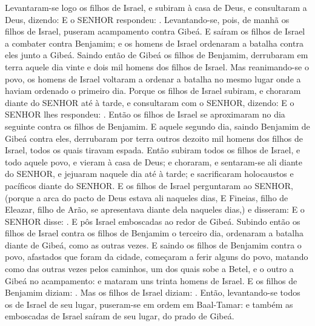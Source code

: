{  Levantaram-se logo os filhos de Israel, e subiram à casa de Deus, e consultaram a Deus, dizendo:  E o SENHOR respondeu: .
  Levantando-se, pois, de manhã os filhos de Israel, puseram acampamento contra Gibeá.
  E saíram os filhos de Israel a combater contra Benjamim; e os homens de Israel ordenaram a batalha contra eles junto a Gibeá.
  Saindo então de Gibeá os filhos de Benjamim, derrubaram em terra aquele dia vinte e dois mil homens dos filhos de Israel.
  Mas reanimando-se o povo, os homens de Israel voltaram a ordenar a batalha no mesmo lugar onde a haviam ordenado o primeiro dia.
  Porque os filhos de Israel subiram, e choraram diante do SENHOR até à tarde, e consultaram com o SENHOR, dizendo:  E o SENHOR lhes respondeu: .
  Então os filhos de Israel se aproximaram no dia seguinte contra os filhos de Benjamim.
  E aquele segundo dia, saindo Benjamim de Gibeá contra eles, derrubaram por terra outros dezoito mil homens dos filhos de Israel, todos os quais tiravam espada.
  Então subiram todos os filhos de Israel, e todo aquele povo, e vieram à casa de Deus; e choraram, e sentaram-se ali diante do SENHOR, e jejuaram naquele dia até à tarde; e sacrificaram holocaustos e pacíficos diante do SENHOR.
  E os filhos de Israel perguntaram ao SENHOR, (porque a arca do pacto de Deus estava ali naqueles dias,
  E Fineias, filho de Eleazar, filho de Arão, se apresentava diante dela naqueles dias,) e disseram:  E o SENHOR disse: .
  E pôs Israel emboscadas ao redor de Gibeá.
  Subindo então os filhos de Israel contra os filhos de Benjamim o terceiro dia, ordenaram a batalha diante de Gibeá, como as outras vezes.
  E saindo os filhos de Benjamim contra o povo, afastados que foram da cidade, começaram a ferir alguns do povo, matando como das outras vezes pelos caminhos, um dos quais sobe a Betel, e o outro a Gibeá no acampamento: e mataram uns trinta homens de Israel.
  E os filhos de Benjamim diziam: . Mas os filhos de Israel diziam: .
  Então, levantando-se todos os de Israel de seu lugar, puseram-se em ordem em Baal-Tamar: e também as emboscadas de Israel saíram de seu lugar, do prado de Gibeá.
}
